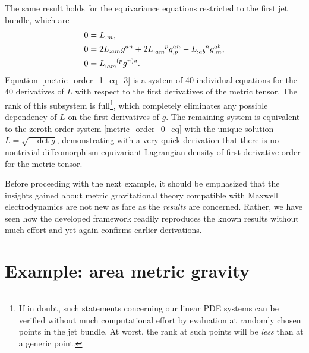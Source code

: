 The same result holds for the equivariance equations restricted to the first jet bundle, which are
\begin{subequations}
  \begin{align}
    0 &{} = L_{,m}, \label{metric_order_1_eq_1}\\
    0 &{} = 2 L_{:am}g^{an} + 2 L_{:am}^{\hphantom{:am}p}g^{an}_{,p} - L_{:ab}^{\hphantom{:ab}n}g^{ab}_{,m}, \label{metric_order_1_eq_2}\\
    0 &{} = L_{:am}^{\hphantom{:am}(p}g^{n)a}. \label{metric_order_1_eq_3}
  \end{align}
\end{subequations}
Equation~\ref{metric_order_1_eq_3} is a system of 40 individual equations for the 40 derivatives of $L$ with respect to the first derivatives of the metric tensor. The rank of this subsystem is full\footnote{If in doubt, such statements concerning our linear PDE systems can be verified without much computational effort by evaluation at randomly chosen points in the jet bundle. At worst, the rank at such points will be \emph{less} than at a generic point.}, which completely eliminates any possible dependency of $L$ on the first derivatives of $g$. The remaining system is equivalent to the zeroth-order system \eqref{metric_order_0_eq} with the unique solution $L=\sqrt{-\operatorname{det}g}$, demonstrating with a very quick derivation that there is no nontrivial diffeomorphism equivariant Lagrangian density of first derivative order for the metric tensor.

Before proceeding with the next example, it should be emphasized that the insights gained about metric gravitational theory compatible with Maxwell electrodynamics are not new as fare as the \emph{results} are concerned. Rather, we have seen how the developed framework readily reproduces the known results without much effort and yet again confirms earlier derivations.

\section{Example: area metric gravity}
\label{section_gled}

